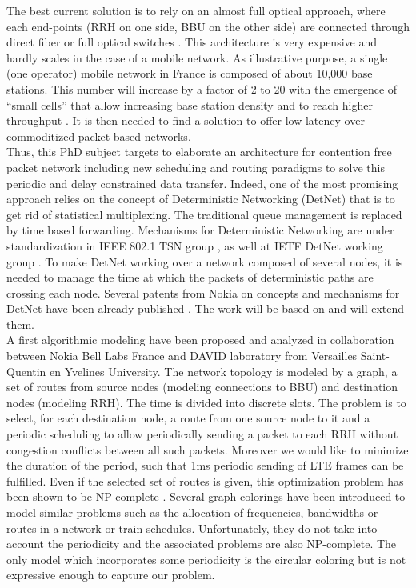 \documentclass{article}
\begin{document}
The best current solution is to rely on an almost full optical approach, where each end-points (RRH on one side, BBU on the other side) are connected through direct fiber or full optical switches \cite{5gppparchitecture}. This architecture is very expensive and hardly scales in the case of a mobile network. As illustrative purpose, a single (one operator) mobile network in France is composed of about 10,000 base stations. This number will increase by a factor of 2 to 20 with the emergence of “small cells” that allow increasing base station density and to reach higher throughput \cite{5gppparchitecture}. It is then needed to find a solution to offer low latency over commoditized packet based networks.\\ 

Thus, this PhD subject targets to elaborate an architecture for contention free packet network including new scheduling and routing paradigms to solve this periodic and delay constrained data transfer. Indeed, one of the most promising approach relies on the concept of Deterministic Networking (DetNet) that is to get rid of statistical multiplexing. The traditional queue management is replaced by time based forwarding. Mechanisms for Deterministic Networking are under standardization in IEEE 802.1 TSN group \cite{ieee802}, as well at IETF DetNet working group \cite{finn-detnet-architecture-08}.  To make DetNet working over a network composed of several nodes, it is needed to manage the time at which the packets of deterministic paths are crossing each node. Several patents from Nokia on concepts and mechanisms for DetNet have been  already   published \cite{howe2005time,leclerc2015contention,leclerc2016signaling,leclerc2016transmission,roos1994method,coherentflow}. The work will be based on and will extend them.\\

A first algorithmic modeling have been proposed and analyzed in collaboration between Nokia Bell Labs France and DAVID laboratory from Versailles Saint-Quentin en Yvelines University. The network topology is modeled by a graph, a set of routes from source nodes (modeling connections to BBU) and destination nodes (modeling RRH). The time is divided into discrete slots. The problem is to select, for each destination node, a route from one source node to it and a periodic scheduling to allow periodically sending a packet to each RRH without congestion conflicts between all such packets. Moreover we would like to minimize the duration of the period, such that 1ms periodic sending of LTE frames can be fulfilled. Even if the selected set of routes is given, this optimization problem has been shown to be NP-complete \cite{rapportstage}. Several graph colorings have been introduced to model similar problems such as the allocation of frequencies\cite{borndorfer1998frequency},  bandwidths\cite{erlebach2001complexity} or routes\cite{cole1996benefit} in a network or train schedules\cite{strotmann2007railway}. Unfortunately, they do not take into account the periodicity and the associated problems are also NP-complete. The only model which incorporates some periodicity is the circular coloring\cite{zhu2006recent,zhou2013multiple,zhu2001circular} but is not expressive enough to capture our problem.\\
\end{document}
